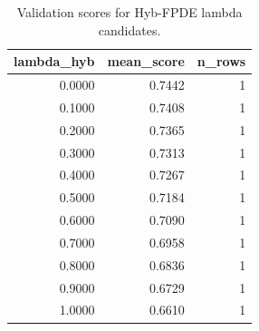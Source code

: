 \begin{table}[t]
\caption{Validation scores for Hyb-FPDE lambda candidates.}
\label{tab:lambda_distribution_computed}
\centering
\begin{tabular}{rrr}
\toprule
lambda\_hyb & mean\_score & n\_rows \\
\midrule
0.0000 & 0.7442 & 1 \\
0.1000 & 0.7408 & 1 \\
0.2000 & 0.7365 & 1 \\
0.3000 & 0.7313 & 1 \\
0.4000 & 0.7267 & 1 \\
0.5000 & 0.7184 & 1 \\
0.6000 & 0.7090 & 1 \\
0.7000 & 0.6958 & 1 \\
0.8000 & 0.6836 & 1 \\
0.9000 & 0.6729 & 1 \\
1.0000 & 0.6610 & 1 \\
\bottomrule
\end{tabular}

\end{table}
